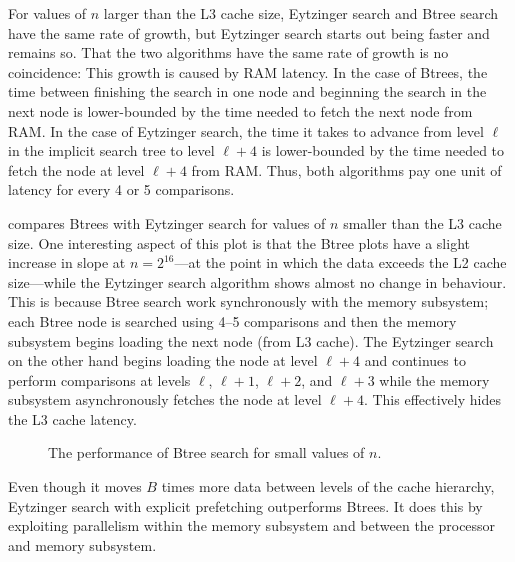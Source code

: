 \documentclass{patmorin}
\begin{document}
For values of $n$ larger than the L3 cache size, Eytzinger search and
Btree search have the same rate of growth, but Eytzinger search starts
out being faster and remains so.  That the two algorithms have the same
rate of growth is no coincidence: This growth is caused by RAM latency.
In the case of Btrees, the time between finishing the search in one
node and beginning the search in the next node is lower-bounded by the
time needed to fetch the next node from RAM.  In the case of Eytzinger
search, the time it takes to advance from level $\ell$ in the implicit
search tree to level $\ell+4$ is lower-bounded by the time needed to fetch
the node at level $\ell+4$ from RAM.  Thus, both algorithms pay one unit of
latency for every 4 or 5 comparisons.

 compares Btrees with Eytzinger search for values
of $n$ smaller than the L3 cache size.  One interesting aspect of
this plot is that the Btree plots have a slight increase in slope
at $n=2^{16}$---at the point in which the data exceeds the L2 cache
size---while the Eytzinger search algorithm shows almost no change in
behaviour.  This is because Btree search work synchronously with the memory
subsystem; each Btree node is searched using 4--5 comparisons and
then the memory subsystem begins loading the next node (from L3 cache).
The Eytzinger search on the other hand begins loading the node at level
$\ell+4$ and continues to perform comparisons at levels $\ell$, $\ell+1$,
$\ell+2$, and $\ell+3$ while the memory subsystem asynchronously fetches
the node at level $\ell+4$. This effectively hides the L3 cache latency.

\begin{figure}
   \caption{The performance of Btree search for small values of $n$.}
\end{figure}

\begin{lesson}
  Even though it moves $B$ times more data between levels of the cache
  hierarchy, Eytzinger search with explicit prefetching outperforms
  Btrees.  It does this by exploiting parallelism within the memory
  subsystem and between the processor and memory subsystem.
\end{lesson}

%
%
%
%
%
%
%
\end{document}
